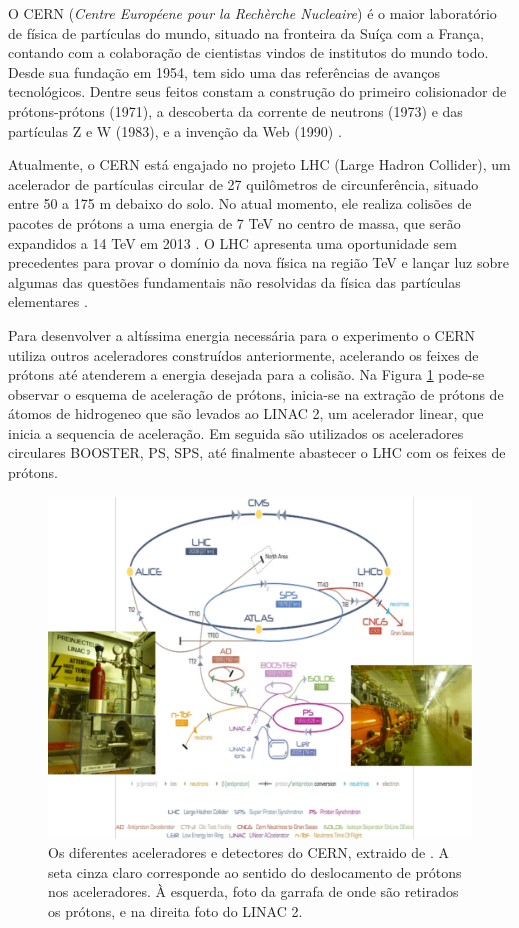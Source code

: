 O CERN ({\it Centre Européene pour la Rechèrche Nucleaire}) é o maior
laboratório de física de partículas do mundo, situado na fronteira da Suíça com
a França, contando com a colaboração de cientistas vindos de institutos
do mundo todo. Desde sua fundação em 1954, tem sido uma das referências de
avanços tecnológicos. Dentre seus feitos constam a construção do primeiro 
colisionador de prótons-prótons (1971), a descoberta 
da corrente de neutrons (1973) e das partículas Z e W (1983), 
e a invenção da Web (1990) \cite{webCERN}.

Atualmente, o CERN está engajado no projeto LHC (Large Hadron
Collider), um acelerador de partículas circular de 27 quilômetros de
circunferência, situado entre 50 a 175 m debaixo do solo. 
No atual momento, ele realiza colisões de pacotes de prótons a uma energia
de 7 TeV no centro de massa, que serão expandidos a 14 TeV em 2013 \cite{webATLASa}.
O LHC apresenta uma oportunidade sem precedentes para provar o domínio da
nova física na região TeV e lançar luz sobre algumas das questões fundamentais
não resolvidas da física das partículas elementares \cite{hunt_for_physics}. 

Para desenvolver a altíssima energia necessária para o experimento o CERN 
utiliza outros aceleradores construídos anteriormente, acelerando os feixes de prótons até atenderem
a energia desejada para a colisão. Na Figura \ref{fig:esquema_aceleradores} pode-se observar
o esquema de aceleração de prótons, inicia-se na extração de prótons de átomos
de hidrogeneo que são levados ao LINAC 2, um acelerador linear,
que inicia a sequencia de aceleração. Em seguida são utilizados os aceleradores
circulares BOOSTER, PS, SPS, até finalmente abastecer o LHC com os feixes de
prótons.

\begin{figure}[h!t]
\centering
\includegraphics[width=\textwidth]{imagens/lhc_garrafa_linac2.pdf}
\caption{Os diferentes aceleradores e detectores do CERN, extraido de
\cite{cern_accelerators}. A seta cinza claro corresponde ao sentido do
deslocamento de prótons nos aceleradores. À esquerda, foto da garrafa
de onde são retirados os prótons, e na direita foto do LINAC 2.}
\label{fig:esquema_aceleradores}
\end{figure}

